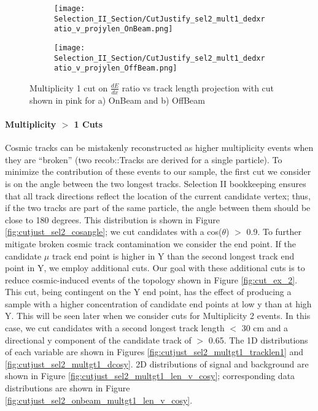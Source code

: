\documentclass{article}
\begin{document}
\begin{figure}[t!]
\centering
\begin{subfigure}[t]{0.25\textwidth}
  \centering
  \texttt{[image: Selection\_II\_Section/CutJustify\_sel2\_mult1\_dedxratio\_v\_projylen\_OnBeam.png]}  
  \caption{ }
  \end{subfigure} 
  \hspace{1 mm}
  \begin{subfigure}[t]{0.25\textwidth}
    \centering
\texttt{[image: Selection\_II\_Section/CutJustify\_sel2\_mult1\_dedxratio\_v\_projylen\_OffBeam.png]}
  \caption{ }
  \end{subfigure} 
\caption{Multiplicity 1 cut on $\frac{dE}{dx}$ ratio vs track length projection with cut shown in pink for a) OnBeam and b) OffBeam }
\label{fig:cutjust_sel2_onbeam_mult1_dedxratio_v_leny}

\end{figure}

\clearpage
\paragraph{Multiplicity $>$ 1 Cuts}
Cosmic tracks can be mistakenly reconstructed as higher multiplicity events when they are ``broken'' (two recob::Tracks are derived for a single particle). To minimize the contribution of these events to our sample, the first cut we consider is on the angle between the two longest tracks. Selection II bookkeeping ensures that all track directions reflect the location of the current candidate vertex; thus, if the two tracks are part of the same particle, the angle between them should be close to 180 degrees. This distribution is shown in Figure \ref{fig:cutjust_sel2_cosangle}; we cut candidates with a cos($\theta$) $>$ 0.9.  To further mitigate broken cosmic track contamination we consider the end point.  If the candidate $\mu$ track end point is higher in Y than the second longest track end point in Y, we employ additional cuts. Our goal with these additional cuts is to reduce cosmic-induced events of the topology shown in Figure \ref{fig:cut_ex_2}. This cut, being contingent on the Y end point, has the effect of producing a sample with a higher concentration of candidate end points at low y than at high Y.  This will be seen later when we consider cuts for Multiplicity 2 events.  In this case, we cut candidates with a second longest track length $<$ 30 cm and a directional y component of the candidate track of $>$ 0.65. The 1D distributions of each variable are shown in Figures \ref{fig:cutjust_sel2_multgt1_tracklen1} and \ref{fig:cutjust_sel2_multgt1_dcosy}.  2D distributions of signal and background are shown in Figure \ref{fig:cutjust_sel2_multgt1_len_v_cosy}; corresponding data distributions are shown in Figure \ref{fig:cutjust_sel2_onbeam_multgt1_len_v_cosy}. 
\end{document}
